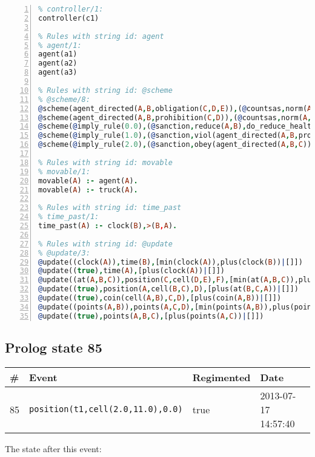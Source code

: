 \documentclass[11pt]{article}\usepackage[utf8]{inputenc}\usepackage{geometry}
\begin{document}
\begin{lstlisting}[language=Prolog, numbers=left]
% Rules with string id: controller
% controller/1:
controller(c1)

% Rules with string id: agent
% agent/1:
agent(a1)
agent(a2)
agent(a3)

% Rules with string id: @scheme
% @scheme/8:
@scheme(agent_directed(A,B,obligation(C,D,E)),(@countsas,norm(A,B,F,obligation(C,D,E)),F),false,(listTrue(C)),(time_past(D)),false,[plus(viol(agent_directed(A,B,obligation(C,D,E))))|[]],[plus(obey(agent_directed(A,B,obligation(C,D,E))))|[]])
@scheme(agent_directed(A,B,prohibition(C,D)),(@countsas,norm(A,B,E,prohibition(C,D)),E),(listTrue(C)),false,(false),false,[plus(viol(agent_directed(A,B,prohibition(C,D))))|[]],[plus(obey(agent_directed(A,B,prohibition(C,D))))|[]])
@scheme(@imply_rule(0.0),(@sanction,reduce(A,B),do_reduce_health(A,B),notifyAgent(A,changed(status))),true,false,false,false,[min(reduce(A,B))|[]],[])
@scheme(@imply_rule(1.0),(@sanction,viol(agent_directed(A,B,prohibition(C,D))),do_sanction(D)),true,false,false,false,[min(viol(agent_directed(A,B,prohibition(C,D))))|[]],[])
@scheme(@imply_rule(2.0),(@sanction,obey(agent_directed(A,B,C))),true,false,false,false,[min(obey(agent_directed(A,B,C)))|[]],[])

% Rules with string id: movable
% movable/1:
movable(A) :- agent(A).
movable(A) :- truck(A).

% Rules with string id: time_past
% time_past/1:
time_past(A) :- clock(B),>(B,A).

% Rules with string id: @update
% @update/3:
@update((clock(A)),time(B),[min(clock(A)),plus(clock(B))|[]])
@update((true),time(A),[plus(clock(A))|[]])
@update((at(A,B,C)),position(C,cell(D,E),F),[min(at(A,B,C)),plus(at(D,E,C))|[]])
@update((true),position(A,cell(B,C),D),[plus(at(B,C,A))|[]])
@update((true),coin(cell(A,B),C,D),[plus(coin(A,B))|[]])
@update((points(A,B)),points(A,C,D),[min(points(A,B)),plus(points(A,D))|[]])
@update((true),points(A,B,C),[plus(points(A,C))|[]])

\end{lstlisting}
\clearpage 
\subsection{Prolog state 85}
\begin{table}[ht]
\centering 
\begin{tabular}{l l l l} 
\textbf{\#} & \textbf{Event} & \textbf{Regimented} & \textbf{Date} \\ [0.5ex] 
\hline
85&\texttt{position(t1,cell(2.0,11.0),0.0)}&true&2013-07-17 14:57:40\\ [1ex] \hline\end{tabular}
\end{table}
The state after this event:
\end{document}
